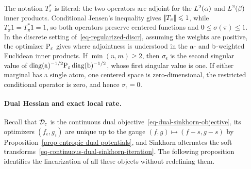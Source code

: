 The notation $T_\pi^*$ is literal: the two operators are adjoint for the $L^2(\al)$ and $L^2(\be)$ inner products. Conditional Jensen's inequality gives $\norm{T_\pi}\leq1$, while $T_\pi1=T_\pi^*1=1$, so both operators preserve centered functions and $0\leq\sigma(\pi)\leq1$. In the discrete setting of~\eqref{eq-regularized-discr}, assuming the weights are positive, the optimizer $\P_\epsilon$ gives
where adjointness is understood in the $\a$- and $\b$-weighted Euclidean inner products. If $\min(n,m)\geq2$, then $\sigma_\epsilon$ is the second singular value of
\(
	\diag(\a)^{-1/2}\P_\epsilon\diag(\b)^{-1/2}
\),
whose first singular value is one. If either marginal has a single atom, one centered space is zero-dimensional, the restricted conditional operator is zero, and hence $\sigma_\epsilon=0$.

\paragraph{Dual Hessian and exact local rate.}

Recall that $\Dd_\epsilon$ is the continuous dual objective~\eqref{eq-dual-sinkhorn-objective}, its optimizers $(f_\epsilon,g_\epsilon)$ are unique up to the gauge $(f,g)\mapsto(f+s,g-s)$ by Proposition~\ref{prop-entropic-dual-potentials}, and Sinkhorn alternates the soft transforms~\eqref{eq-continuous-dual-sinkhorn-iteration}. The following proposition identifies the linearization of all these objects without redefining them.

